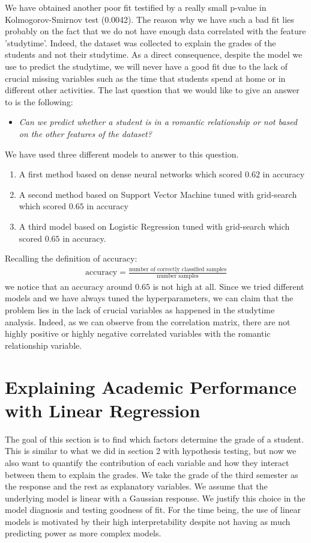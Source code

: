 \documentclass[a4paper, 11pt]{report}
\theoremstyle{definition}
\numberwithin{equation}{section}		%
\numberwithin{figure}{section}			%
\numberwithin{table}{section}				%
\begin{document}
We have obtained another poor fit testified by a really small p-value in Kolmogorov-Smirnov test (0.0042). The reason why we have such a bad fit lies probably on the fact that we do not have enough data correlated with the feature 'studytime'. Indeed, the dataset was collected to explain the grades of the students and not their studytime. As a direct consequence, despite the model we use to predict the studytime, we will never have a good fit due to the lack of crucial missing variables such as the time that students spend at home or in different other activities.
The last question that we would like to give an answer to is the following:
\begin{itemize}
    \item \textit{Can we predict whether a student is in a romantic relationship or not based on the other features of the dataset?}
\end{itemize}
We have used three different models to answer to this question.
\begin{enumerate}
    \item A first method based on dense neural networks which scored $0.62$ in accuracy
    \item A second method based on Support Vector Machine tuned with grid-search which scored $0.65$ in accuracy
    \item A third model based on Logistic Regression tuned with grid-search which scored $0.65$ in accuracy.
\end{enumerate}
Recalling the definition of accuracy:
\begin{align*}
    \text{accuracy} = \frac{\text{number of correctly classified samples}}{\text{number samples}}
\end{align*}
we notice that an accuracy around $0.65$ is not high at all. Since we tried different models and we have always tuned the hyperparameters, we can claim that the problem lies in the lack of crucial variables as happened in the studytime analysis. Indeed, as we can observe from the correlation matrix, there are not highly positive or highly negative correlated variables with the romantic relationship variable.


\newpage
\section{Explaining Academic Performance with Linear Regression}
The goal of this section is to find which factors determine the grade of a student. This is similar to what we did in section 2 with hypothesis testing, but now we also want to quantify the contribution of each variable and how they interact between them to explain the grades. We take the grade of the third semester as the response and the rest as explanatory variables. We assume that the underlying model is linear with a Gaussian response. We justify this choice in the model diagnosis and testing goodness of fit. For the time being, the use of linear models is motivated by their high interpretability despite not having as much predicting power as more complex models. \bigskip
\end{document}
